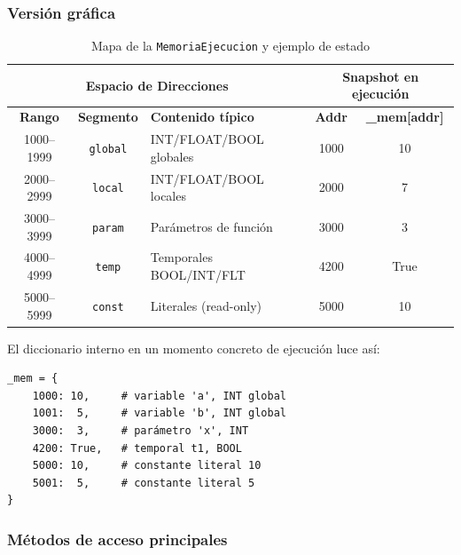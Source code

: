 \documentclass[12pt, letterpaper]{article}
\theoremstyle{definition}
\begin{document}
\subsubsection*{Versión gráfica}
 
\begin{table}[H]
\centering
\caption{Mapa de la \texttt{MemoriaEjecucion} y ejemplo de estado}
\label{tab:memejecucion}
\begin{tabular}{|c|c|l||c|c|}
    \hline
    \multicolumn{3}{|c||}{\textbf{Espacio de Direcciones}} &
    \multicolumn{2}{c|}{\textbf{Snapshot en ejecución}} \\
    \hline
    \textbf{Rango} & \textbf{Segmento} & \textbf{Contenido típico} &
    \textbf{Addr} & \textbf{\_mem{[}addr{]}} \\ \hline
    \colorbox{green!20}{1000--1999}  & \texttt{global} & INT/FLOAT/BOOL globales & 1000 & 10   \\ \hline
    \colorbox{blue!15}{2000--2999}   & \texttt{local}  & INT/FLOAT/BOOL locales  & 2000 & 7    \\ \hline
    \colorbox{orange!20}{3000--3999} & \texttt{param}  & Parámetros de función   & 3000 & 3    \\ \hline
    \colorbox{yellow!30}{4000--4999} & \texttt{temp}   & Temporales BOOL/INT/FLT & 4200 & True \\ \hline
    \colorbox{gray!20}{5000--5999}   & \texttt{const}  & Literales (read-only)   & 5000 & 10   \\ \hline
\end{tabular}
\end{table}

El diccionario interno en un momento concreto de ejecución luce así:

\begin{verbatim}
_mem = {
    1000: 10,     # variable 'a', INT global
    1001:  5,     # variable 'b', INT global
    3000:  3,     # parámetro 'x', INT
    4200: True,   # temporal t1, BOOL
    5000: 10,     # constante literal 10
    5001:  5,     # constante literal 5
}
\end{verbatim}

\subsubsection*{Métodos de acceso principales}
\end{document}
